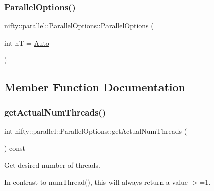 \subsubsection{\texorpdfstring{Parallel\+Options()}{ParallelOptions()}}
{\footnotesize\ttfamily nifty\+::parallel\+::\+Parallel\+Options\+::\+Parallel\+Options (\begin{DoxyParamCaption}\item[{int}]{nT = {\ttfamily \hyperlink{classnifty_1_1parallel_1_1ParallelOptions_a7a945e8bd698883de4af0f906b2aa88aa0bd8f9fd00d78fcfdcb6ee1575f43fd6}{Auto}} }\end{DoxyParamCaption})\hspace{0.3cm}{\ttfamily [inline]}}



\subsection{Member Function Documentation}
\mbox{\label{classnifty_1_1parallel_1_1ParallelOptions_a0d905f623f4de9ce01361065c0042c50}} 
\subsubsection{\texorpdfstring{get\+Actual\+Num\+Threads()}{getActualNumThreads()}}
{\footnotesize\ttfamily int nifty\+::parallel\+::\+Parallel\+Options\+::get\+Actual\+Num\+Threads (\begin{DoxyParamCaption}{ }\end{DoxyParamCaption}) const\hspace{0.3cm}{\ttfamily [inline]}}



Get desired number of threads. 

In contrast to {\ttfamily num\+Thread()}, this will always return a value {\ttfamily $>$=1}. \mbox{\label{classnifty_1_1parallel_1_1ParallelOptions_a25312a5665cb4240e07a989bbf05cf7b}} 
